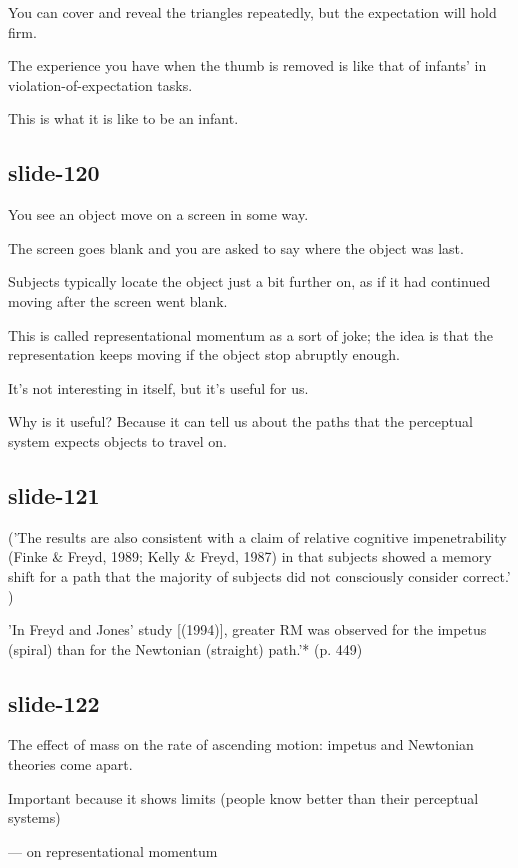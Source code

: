 \documentclass[12pt,\papersize]{extarticle}
\begin{document}
You can cover and reveal the triangles repeatedly, but the expectation will hold firm.
 
 
 
The experience you have when the thumb is removed is like that of infants' in violation-of-expectation tasks.
 
This is what it is like to be an infant.
 
\subsection{slide-120}
You see an object move on a screen in some way.
 
The screen goes blank and you are asked to say where the object was last.
 
Subjects typically locate the object just a bit further on, as if it had continued moving after the screen went blank.
 
This is called representational momentum as a sort of joke; the idea is that the representation keeps moving if the object stop abruptly enough.
 
It's not interesting in itself, but it's useful for us.
 
Why is it useful?  Because it can tell us about the paths that the perceptual system expects objects to travel on.
 
\subsection{slide-121}
\citep{freyd:1994_representational}  ('The results are also consistent with a claim of relative cognitive impenetrability (Finke \& Freyd, 1989; Kelly \& Freyd, 1987) in that subjects showed a memory shift for a path that the majority of subjects did not consciously consider correct.' \citep[p.\ 975]{freyd:1994_representational})
 
'In Freyd and Jones’ study [(1994)], greater RM was observed for the impetus (spiral) than for the Newtonian (straight) path.'* (p. 449)
 
\subsection{slide-122}
The effect of mass on the rate of ascending motion: impetus and Newtonian theories come apart.
 
Important because it shows limits (people know better than their perceptual systems)
 
--- \citep{kozhevnikov:2001_impetus} on representational momentum
 
\end{document}
